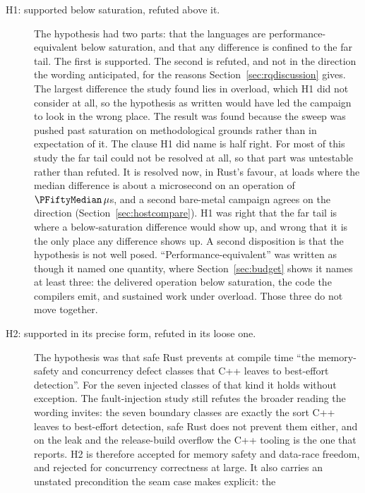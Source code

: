 \begin{description}
  \item[H1: supported below saturation, refuted above it.]
        The hypothesis had two parts: that the languages are performance-equivalent below
        saturation, and that any difference is confined to the far tail. The first is supported.
        The second is refuted, and not in the direction the wording anticipated, for the reasons
        Section~\ref{sec:rqdiscussion} gives. The largest difference the study found lies in
        overload, which H1 did not consider at all, so the hypothesis as written would have led
        the campaign to look in the wrong place. The result was found because the sweep was pushed
        past saturation on methodological grounds rather than in expectation of it. The clause H1
        did name is half right. For most of this study the far tail could not be resolved at all,
        so that part was untestable rather than refuted. It is resolved now, in Rust's favour, at
        loads where the median difference is about a microsecond on an operation of
        $\PFiftyMedian\,\mu$s, and a second bare-metal campaign agrees on the direction
        (Section~\ref{sec:hostcompare}). H1 was right that the far tail is where a
        below-saturation difference would show up, and wrong that it is the only place any
        difference shows up. A second disposition is that the hypothesis is not well posed.
        ``Performance-equivalent'' was written as though it named one quantity, where
        Section~\ref{sec:budget} shows it names at least three: the delivered operation below
        saturation, the code the compilers emit, and sustained work under overload. Those three do
        not move together.
  \item[H2: supported in its precise form, refuted in its loose one.] The hypothesis was
        that safe Rust prevents at compile time ``the memory-safety and concurrency defect
        classes that C++ leaves to best-effort detection''. For the seven injected classes of
        that kind it holds without exception. The fault-injection study still refutes the broader
        reading the wording invites: the seven boundary classes are exactly the sort C++ leaves to
        best-effort detection, safe Rust does not prevent them either, and on the leak and the
        release-build overflow the C++ tooling is the one that reports. H2 is therefore accepted
        for memory safety and data-race freedom, and rejected for concurrency correctness at
        large. It also carries an unstated precondition the seam case makes explicit: the

\end{description}
